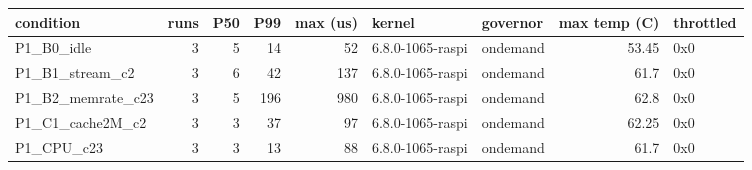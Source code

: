 \begin{tabular}{lrrrrllrl}
\toprule
condition & runs & P50 & P99 & max (us) & kernel & governor & max temp (C) & throttled \\
\midrule
P1\_B0\_idle & 3 & 5 & 14 & 52 & 6.8.0-1065-raspi & ondemand & 53.45 & 0x0 \\
P1\_B1\_stream\_c2 & 3 & 6 & 42 & 137 & 6.8.0-1065-raspi & ondemand & 61.7 & 0x0 \\
P1\_B2\_memrate\_c23 & 3 & 5 & 196 & 980 & 6.8.0-1065-raspi & ondemand & 62.8 & 0x0 \\
P1\_C1\_cache2M\_c2 & 3 & 3 & 37 & 97 & 6.8.0-1065-raspi & ondemand & 62.25 & 0x0 \\
P1\_CPU\_c23 & 3 & 3 & 13 & 88 & 6.8.0-1065-raspi & ondemand & 61.7 & 0x0 \\
\bottomrule
\end{tabular}
